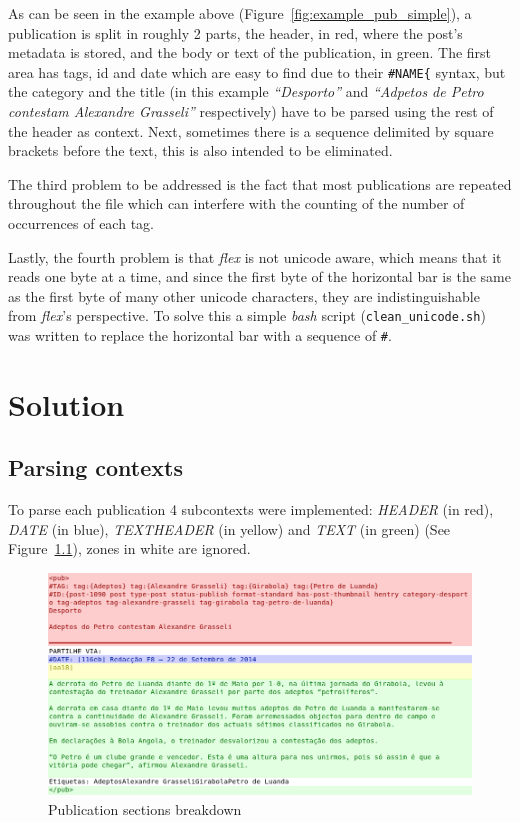 \documentclass[a4paper]{report}
\begin{document}
As can be seen in the example above (Figure~\ref{fig:example_pub_simple}), a
publication is split in roughly 2 parts, the header, in red, where the post's
metadata is stored, and the body or text of the publication, in green. The first
area has tags, id and date which are easy to find due to their
\verb!#NAME{! syntax, but the category and the title (in this example
\textit{``Desporto''} and \textit{``Adpetos de Petro contestam Alexandre
Grasseli''} respectively) have to be parsed using the rest of the header as
context. Next, sometimes there is a sequence delimited by square brackets before
the text, this is also intended to be eliminated.

The third problem to be addressed is the fact that most publications
are repeated throughout the file which can interfere with the counting of the
number of occurrences of each tag.

Lastly, the fourth problem is that \textit{flex} is not unicode aware,
which means that it reads one byte at a time, and since the first byte of the
horizontal bar is the same as the first byte of many other unicode characters,
they are indistinguishable from \textit{flex}'s perspective. To solve this a
simple \textit{bash} script (\texttt{clean\_unicode.sh}) was written to replace
the horizontal bar with a sequence of \verb!#!.

\chapter{Solution}

\section{Parsing contexts}

To parse each publication 4 subcontexts were implemented: \textit{HEADER} (in
red), \textit{DATE} (in blue), \textit{TEXTHEADER} (in yellow) and
\textit{TEXT} (in green) (See Figure~\ref{fig:example_pub_colored}), zones in
white are ignored.

\begin{figure}[h]
    \includegraphics[width=\textwidth]{./example_pub_colored.png}
    \caption{Publication sections breakdown}\label{fig:example_pub_colored}
\end{figure}
\end{document}
